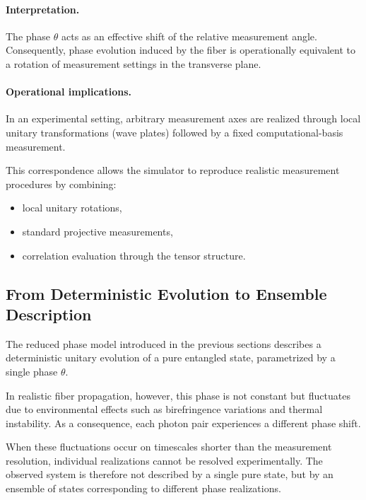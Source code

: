 \documentclass[a4paper]{article}
\begin{document}
\medskip

\paragraph{Interpretation.}

The phase \( \theta \) acts as an effective shift of the relative measurement angle. Consequently, phase evolution induced by the fiber is operationally equivalent to a rotation of measurement settings in the transverse plane.

\medskip

\paragraph{Operational implications.}

In an experimental setting, arbitrary measurement axes are realized through local unitary transformations (wave plates) followed by a fixed computational-basis measurement.

This correspondence allows the simulator to reproduce realistic measurement procedures by combining:
\begin{itemize}
\item local unitary rotations,
\item standard projective measurements,
\item correlation evaluation through the tensor structure.
\end{itemize}


\subsection{From Deterministic Evolution to Ensemble Description}

The reduced phase model introduced in the previous sections describes a deterministic unitary evolution of a pure entangled state, parametrized by a single phase \( \theta \).

In realistic fiber propagation, however, this phase is not constant but fluctuates due to environmental effects such as birefringence variations and thermal instability. As a consequence, each photon pair experiences a different phase shift.

\medskip

When these fluctuations occur on timescales shorter than the measurement resolution, individual realizations cannot be resolved experimentally. The observed system is therefore not described by a single pure state, but by an ensemble of states corresponding to different phase realizations.
\end{document}
